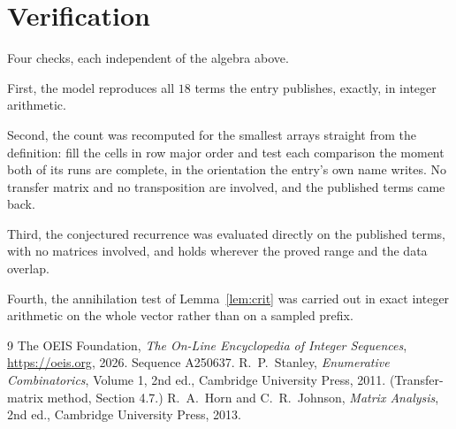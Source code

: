 \documentclass[11pt,a4paper]{article}
\theoremstyle{plain}
\theoremstyle{definition}
\begin{document}
\section{Verification}

Four checks, each independent of the algebra above.

First, the model reproduces all $18$ terms the entry publishes, exactly, in integer
arithmetic.

Second, the count was recomputed for the smallest arrays straight from the definition: fill the
cells in row major order and test each comparison the moment both of its runs are complete,
in the orientation the entry's own name writes. No transfer matrix and no transposition are
involved, and the published terms came back.

Third, the conjectured recurrence was evaluated directly on the published terms, with no
matrices involved, and holds wherever the proved range and the data overlap.

Fourth, the annihilation test of Lemma~\ref{lem:crit} was carried out in exact integer
arithmetic on the whole vector rather than on a sampled prefix.

\begin{thebibliography}{9}
 The OEIS Foundation, \emph{The On-Line Encyclopedia of Integer
Sequences}, \url{https://oeis.org}, 2026. Sequence A250637.
 R.~P.~Stanley, \emph{Enumerative Combinatorics}, Volume 1, 2nd ed.,
Cambridge University Press, 2011. (Transfer-matrix method, Section 4.7.)
 R.~A.~Horn and C.~R.~Johnson, \emph{Matrix Analysis}, 2nd ed., Cambridge
University Press, 2013.
\end{thebibliography}
\end{document}
